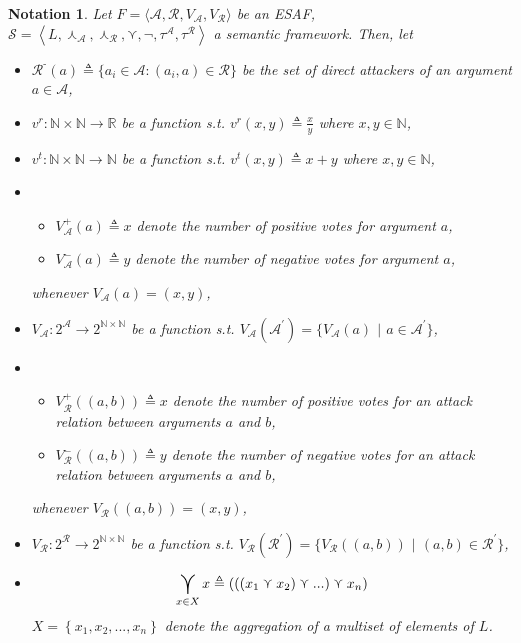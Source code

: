 \documentclass{article}
\newtheorem{notation}{Notation}
\newcommand{\nat}{\mathbb{N}}   %
\newcommand{\real}{\mathbb{R}}  %
\newcommand{\args}{\mathcal{A}} %
\newcommand{\att}{\mathcal{R}}  %
\newcommand{\valueset}{L}
\newcommand{\varg}{V_{\args}}   %
\newcommand{\vargpro}[1]{\varg^+\left(#1\right)} %
\newcommand{\vargcon}[1]{\varg^-\left(#1\right)} %
\newcommand{\vatt}{V_{\att}}   %
\newcommand{\vattpro}[1]{\vatt^+\left(#1\right)} %
\newcommand{\vattcon}[1]{\vatt^-\left(#1\right)} %
\newcommand{\attackers}[1]{\att^\text{-}\left(#1\right)}
\newcommand{\safid}{F}               %
\newcommand{\saf}{\safid = \safbody} %
\newcommand{\safbody}{\langle \args, \att, \varg, \vatt \rangle} %
\newcommand{\sembodyNew}{\left\langle \valueset,\SAFand_\mathcal{A}, \SAFand_\mathcal{R}, \SAFor, \lnot, \tau^{\args}, \tau^{\att}\right\rangle} %
\newcommand{\SAFand}{\curlywedge}     %
\newcommand{\SAFor}{\curlyvee}        %
\DeclareMathOperator*{\SAFOr}{\bigcurlyvee} %
\newcommand{\sem}{\mathcal{S}}
\begin{document}
\begin{notation}
Let $\saf$ be an ESAF, $\sem = \sembodyNew$ a semantic framework. Then, let
\begin{itemize}
\item $\attackers{a} \triangleq \{a_i \in \args: (a_i, a) \in \att\}$ be the set of direct attackers of an argument $a \in \args$, 
\item $v^r: \nat \times \nat \to \real$ be a function s.t. $v^r(x, y) \triangleq \frac{x}{y}$ where $x, y \in \mathbb{N}$,
\item $v^t: \nat \times \nat \to \nat$ be a function s.t. $v^t(x, y) \triangleq x + y$ where $x, y \in \mathbb{N}$, 
\item 
\begin{itemize}
\item $\vargpro a \triangleq x$ denote the number of positive votes for argument $a$,
\item $\vargcon a \triangleq y$ denote the number of negative votes for argument $a$,
\end{itemize}
whenever $\varg (a) = (x, y)$,
\\
\item $\varg: 2^\args \to 2^{\nat \times \nat}$ be a function s.t. $\varg(\mathcal{A}^{'}) = \{\varg(a)$ $|$ $a \in \mathcal{A^{'}}\}$,
\item
\begin{itemize}
\item $\vattpro{(a, b)} \triangleq x$ denote the number of positive votes for an attack relation between arguments  $a$ and $b$,
\item  $ \vattcon{(a, b)} \triangleq y$ denote the number of negative votes for an attack relation between arguments  $a$ and $b$,
\end{itemize}
whenever $\vatt ((a, b)) = (x, y)$,
\\
\item $\vatt: 2^\att \to 2^{\nat \times \nat}$ be a function s.t. $\vatt(\mathcal{R}^{'}) = \{\vatt((a, b))$ $|$ $(a, b) \in \mathcal{R}^{'}\}$,
\item$$\SAFOr_{x \in X} x \triangleq\left(\left(\left(  x_{1}\SAFor x_{2}\right) \SAFor...\right)\SAFor x_{n}\right)$$ $X=\left\{  x_{1},x_{2},...,x_{n}\right\}$ denote the aggregation of a multiset of elements of $\valueset$. 


\end{itemize}
\end{notation}
\end{document}
